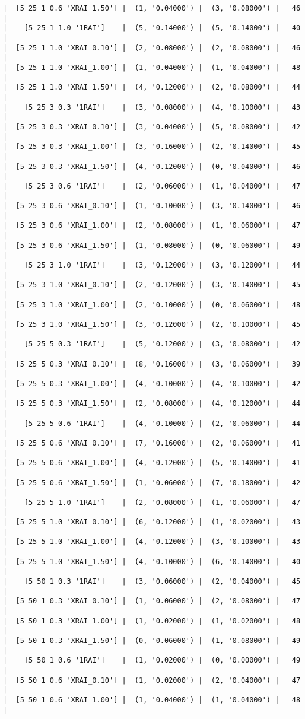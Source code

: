 \documentclass{article}
\begin{document}
\begin{verbatim}
|  [5 25 1 0.6 'XRAI_1.50'] |  (1, '0.04000') |  (3, '0.08000') |   46  |
|    [5 25 1 1.0 '1RAI']    |  (5, '0.14000') |  (5, '0.14000') |   40  |
|  [5 25 1 1.0 'XRAI_0.10'] |  (2, '0.08000') |  (2, '0.08000') |   46  |
|  [5 25 1 1.0 'XRAI_1.00'] |  (1, '0.04000') |  (1, '0.04000') |   48  |
|  [5 25 1 1.0 'XRAI_1.50'] |  (4, '0.12000') |  (2, '0.08000') |   44  |
|    [5 25 3 0.3 '1RAI']    |  (3, '0.08000') |  (4, '0.10000') |   43  |
|  [5 25 3 0.3 'XRAI_0.10'] |  (3, '0.04000') |  (5, '0.08000') |   42  |
|  [5 25 3 0.3 'XRAI_1.00'] |  (3, '0.16000') |  (2, '0.14000') |   45  |
|  [5 25 3 0.3 'XRAI_1.50'] |  (4, '0.12000') |  (0, '0.04000') |   46  |
|    [5 25 3 0.6 '1RAI']    |  (2, '0.06000') |  (1, '0.04000') |   47  |
|  [5 25 3 0.6 'XRAI_0.10'] |  (1, '0.10000') |  (3, '0.14000') |   46  |
|  [5 25 3 0.6 'XRAI_1.00'] |  (2, '0.08000') |  (1, '0.06000') |   47  |
|  [5 25 3 0.6 'XRAI_1.50'] |  (1, '0.08000') |  (0, '0.06000') |   49  |
|    [5 25 3 1.0 '1RAI']    |  (3, '0.12000') |  (3, '0.12000') |   44  |
|  [5 25 3 1.0 'XRAI_0.10'] |  (2, '0.12000') |  (3, '0.14000') |   45  |
|  [5 25 3 1.0 'XRAI_1.00'] |  (2, '0.10000') |  (0, '0.06000') |   48  |
|  [5 25 3 1.0 'XRAI_1.50'] |  (3, '0.12000') |  (2, '0.10000') |   45  |
|    [5 25 5 0.3 '1RAI']    |  (5, '0.12000') |  (3, '0.08000') |   42  |
|  [5 25 5 0.3 'XRAI_0.10'] |  (8, '0.16000') |  (3, '0.06000') |   39  |
|  [5 25 5 0.3 'XRAI_1.00'] |  (4, '0.10000') |  (4, '0.10000') |   42  |
|  [5 25 5 0.3 'XRAI_1.50'] |  (2, '0.08000') |  (4, '0.12000') |   44  |
|    [5 25 5 0.6 '1RAI']    |  (4, '0.10000') |  (2, '0.06000') |   44  |
|  [5 25 5 0.6 'XRAI_0.10'] |  (7, '0.16000') |  (2, '0.06000') |   41  |
|  [5 25 5 0.6 'XRAI_1.00'] |  (4, '0.12000') |  (5, '0.14000') |   41  |
|  [5 25 5 0.6 'XRAI_1.50'] |  (1, '0.06000') |  (7, '0.18000') |   42  |
|    [5 25 5 1.0 '1RAI']    |  (2, '0.08000') |  (1, '0.06000') |   47  |
|  [5 25 5 1.0 'XRAI_0.10'] |  (6, '0.12000') |  (1, '0.02000') |   43  |
|  [5 25 5 1.0 'XRAI_1.00'] |  (4, '0.12000') |  (3, '0.10000') |   43  |
|  [5 25 5 1.0 'XRAI_1.50'] |  (4, '0.10000') |  (6, '0.14000') |   40  |
|    [5 50 1 0.3 '1RAI']    |  (3, '0.06000') |  (2, '0.04000') |   45  |
|  [5 50 1 0.3 'XRAI_0.10'] |  (1, '0.06000') |  (2, '0.08000') |   47  |
|  [5 50 1 0.3 'XRAI_1.00'] |  (1, '0.02000') |  (1, '0.02000') |   48  |
|  [5 50 1 0.3 'XRAI_1.50'] |  (0, '0.06000') |  (1, '0.08000') |   49  |
|    [5 50 1 0.6 '1RAI']    |  (1, '0.02000') |  (0, '0.00000') |   49  |
|  [5 50 1 0.6 'XRAI_0.10'] |  (1, '0.02000') |  (2, '0.04000') |   47  |
|  [5 50 1 0.6 'XRAI_1.00'] |  (1, '0.04000') |  (1, '0.04000') |   48  |

\end{verbatim}
\end{document}
